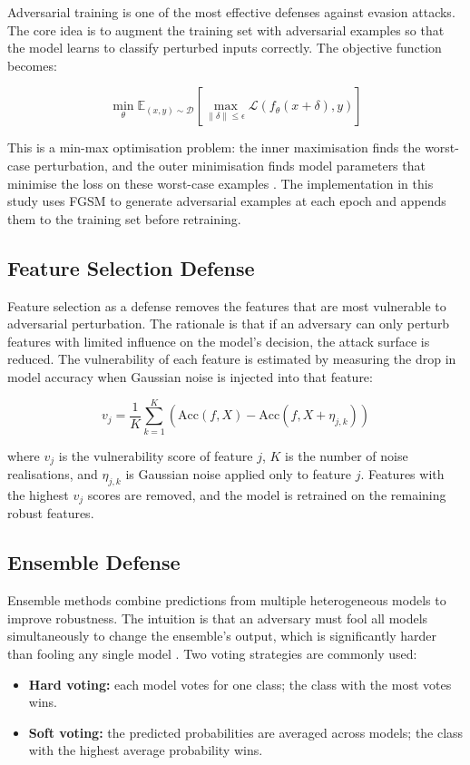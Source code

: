 \documentclass[12pt,a4paper,oneside]{report}
\begin{document}
Adversarial training is one of the most effective defenses against evasion attacks. The core idea is to augment the training set with adversarial examples so that the model learns to classify perturbed inputs correctly. The objective function becomes:

\begin{equation}
    \label{eq:adv_train}
    \min_{\theta} \mathbb{E}_{(x,y)\sim\mathcal{D}} \left[\max_{\|\delta\| \leq \epsilon} \mathcal{L}(f_\theta(x + \delta), y)\right]
\end{equation}

\noindent This is a min-max optimisation problem: the inner maximisation finds the worst-case perturbation, and the outer minimisation finds model parameters that minimise the loss on these worst-case examples \cite{goodfellow2015explaining, madry2018towards}. The implementation in this study uses FGSM to generate adversarial examples at each epoch and appends them to the training set before retraining.

\subsection{Feature Selection Defense}

Feature selection as a defense removes the features that are most vulnerable to adversarial perturbation. The rationale is that if an adversary can only perturb features with limited influence on the model's decision, the attack surface is reduced. The vulnerability of each feature is estimated by measuring the drop in model accuracy when Gaussian noise is injected into that feature:

\begin{equation}
    \label{eq:vulnerability}
    v_j = \frac{1}{K} \sum_{k=1}^{K} \left( \text{Acc}(f, X) - \text{Acc}(f, X + \eta_{j,k}) \right)
\end{equation}

\noindent where $v_j$ is the vulnerability score of feature $j$, $K$ is the number of noise realisations, and $\eta_{j,k}$ is Gaussian noise applied only to feature $j$. Features with the highest $v_j$ scores are removed, and the model is retrained on the remaining robust features.

\subsection{Ensemble Defense}

Ensemble methods combine predictions from multiple heterogeneous models to improve robustness. The intuition is that an adversary must fool all models simultaneously to change the ensemble's output, which is significantly harder than fooling any single model \cite{tramer2018ensemble}. Two voting strategies are commonly used:
\begin{itemize}
    \item \textbf{Hard voting:} each model votes for one class; the class with the most votes wins.
    \item \textbf{Soft voting:} the predicted probabilities are averaged across models; the class with the highest average probability wins.
\end{itemize}
\end{document}
